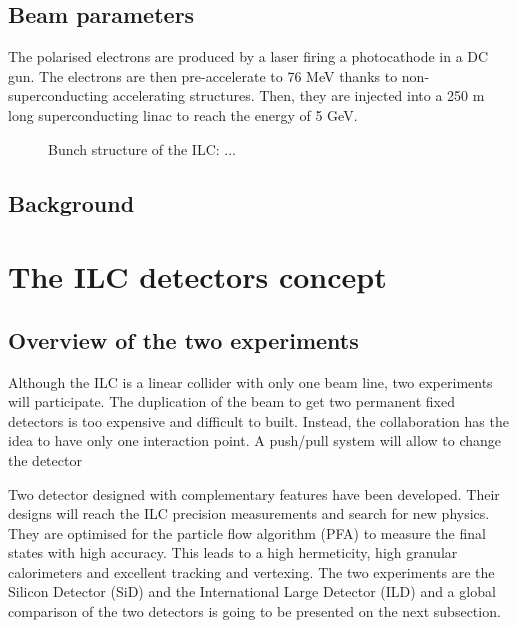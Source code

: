     \subsection{Beam parameters}

    The polarised electrons are produced by a laser firing a photocathode in a DC gun.
    The electrons are then pre-accelerate to 76 MeV thanks to non-superconducting accelerating structures.
    Then, they are injected into a 250 m long superconducting linac to reach the energy of 5 GeV.

    

    \begin{figure}
      \centering
      \caption{Bunch structure of the ILC: ...}
      \label{fig:bunches}
    \end{figure}

    \subsection{Background}

  \section{The ILC detectors concept}

    \subsection{Overview of the two experiments}
    
  Although the ILC is a linear collider with only one beam line, two experiments will participate.
  The duplication of the beam to get two permanent fixed detectors is too expensive and difficult to built.
  Instead, the collaboration has the idea to have only one interaction point.
  A push/pull system will allow to change the detector 

  Two detector designed with complementary features have been developed. 
  Their designs will reach the ILC precision measurements and search for new physics. 
  They are optimised for the particle flow algorithm (PFA) to measure the final states with high accuracy.
  This leads to a high hermeticity, high granular calorimeters and excellent tracking and vertexing. 
  The two experiments are the Silicon Detector (SiD) and the International Large Detector (\gls{ILD}) and a global comparison of the two detectors is going to be presented on the next subsection.


